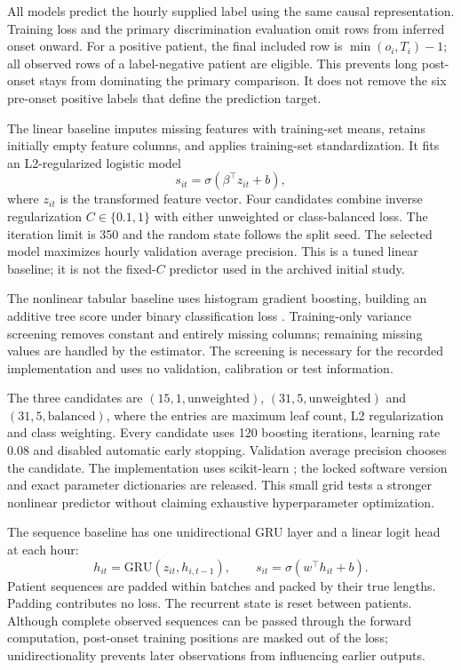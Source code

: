 All models predict the hourly supplied label using the same causal representation. Training loss and the primary discrimination evaluation omit rows from inferred onset onward. For a positive patient, the final included row is $\min(o_i,T_i)-1$; all observed rows of a label-negative patient are eligible. This prevents long post-onset stays from dominating the primary comparison. It does not remove the six pre-onset positive labels that define the prediction target.

The linear baseline imputes missing features with training-set means, retains initially empty feature columns, and applies training-set standardization. It fits an L2-regularized logistic model
\begin{equation*}
 s_{it}=\sigma(\beta^\top z_{it}+b),
\end{equation*}
where $z_{it}$ is the transformed feature vector. Four candidates combine inverse regularization $C\in\{0.1,1\}$ with either unweighted or class-balanced loss. The iteration limit is 350 and the random state follows the split seed. The selected model maximizes hourly validation average precision. This is a tuned linear baseline; it is not the fixed-$C$ predictor used in the archived initial study.

The nonlinear tabular baseline uses histogram gradient boosting, building an additive tree score under binary classification loss \citep{friedman2001}. Training-only variance screening removes constant and entirely missing columns; remaining missing values are handled by the estimator. The screening is necessary for the recorded implementation and uses no validation, calibration or test information.

The three candidates are $(15,1,\mathrm{unweighted})$, $(31,5,\mathrm{unweighted})$ and $(31,5,\mathrm{balanced})$, where the entries are maximum leaf count, L2 regularization and class weighting. Every candidate uses 120 boosting iterations, learning rate 0.08 and disabled automatic early stopping. Validation average precision chooses the candidate. The implementation uses scikit-learn \citep{sklearn}; the locked software version and exact parameter dictionaries are released. This small grid tests a stronger nonlinear predictor without claiming exhaustive hyperparameter optimization.

The sequence baseline has one unidirectional GRU layer \citep{cho2014} and a linear logit head at each hour:
\begin{equation*}
 h_{it}=\mathrm{GRU}(z_{it},h_{i,t-1}),\qquad
 s_{it}=\sigma(w^\top h_{it}+b).
\end{equation*}
Patient sequences are padded within batches and packed by their true lengths. Padding contributes no loss. The recurrent state is reset between patients. Although complete observed sequences can be passed through the forward computation, post-onset training positions are masked out of the loss; unidirectionality prevents later observations from influencing earlier outputs.

